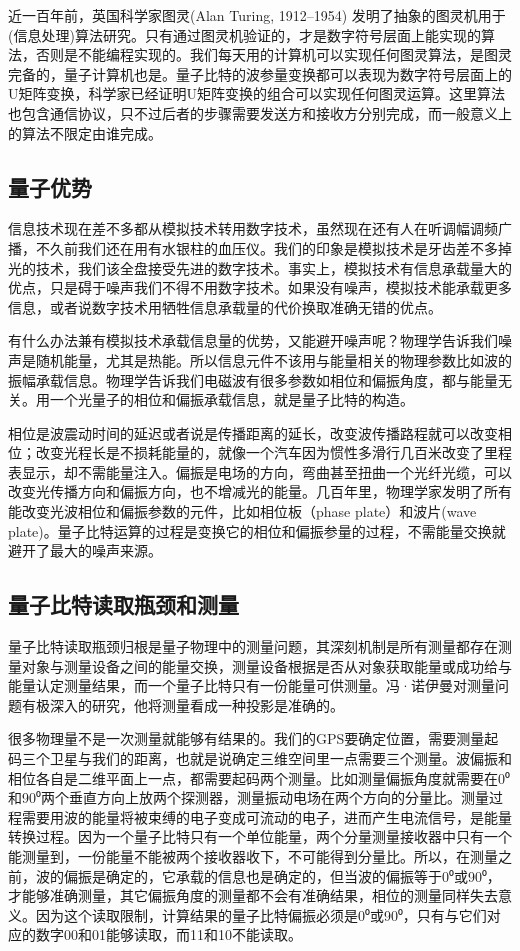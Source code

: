 \documentclass{ctexbook}
\begin{document}
近一百年前，英国科学家图灵(Alan Turing, 1912–1954) 发明了抽象的图灵机用于(信息处理)算法研究。只有通过图灵机验证的，才是数字符号层面上能实现的算法，否则是不能编程实现的。我们每天用的计算机可以实现任何图灵算法，是图灵完备的，量子计算机也是。量子比特的波参量变换都可以表现为数字符号层面上的U矩阵变换，科学家已经证明U矩阵变换的组合可以实现任何图灵运算。这里算法也包含通信协议，只不过后者的步骤需要发送方和接收方分别完成，而一般意义上的算法不限定由谁完成。

\subsection{量子优势}\label{sec:whyquantum}
信息技术现在差不多都从模拟技术转用数字技术，虽然现在还有人在听调幅调频广播，不久前我们还在用有水银柱的血压仪。我们的印象是模拟技术是牙齿差不多掉光的技术，我们该全盘接受先进的数字技术。事实上，模拟技术有信息承载量大的优点，只是碍于噪声我们不得不用数字技术。如果没有噪声，模拟技术能承载更多信息，或者说数字技术用牺牲信息承载量的代价换取准确无错的优点。

有什么办法兼有模拟技术承载信息量的优势，又能避开噪声呢？物理学告诉我们噪声是随机能量，尤其是热能。所以信息元件不该用与能量相关的物理参数比如波的振幅承载信息。物理学告诉我们电磁波有很多参数如相位和偏振角度，都与能量无关。用一个光量子的相位和偏振承载信息，就是量子比特的构造。

相位是波震动时间的延迟或者说是传播距离的延长，改变波传播路程就可以改变相位；改变光程长是不损耗能量的，就像一个汽车因为惯性多滑行几百米改变了里程表显示，却不需能量注入。偏振是电场的方向，弯曲甚至扭曲一个光纤光缆，可以改变光传播方向和偏振方向，也不增减光的能量。几百年里，物理学家发明了所有能改变光波相位和偏振参数的元件，比如相位板（phase plate）和波片(wave plate)。量子比特运算的过程是变换它的相位和偏振参量的过程，不需能量交换就避开了最大的噪声来源。

\subsection{量子比特读取瓶颈和测量}
量子比特读取瓶颈归根是量子物理中的测量问题，其深刻机制是所有测量都存在测量对象与测量设备之间的能量交换，测量设备根据是否从对象获取能量或成功给与能量认定测量结果，而一个量子比特只有一份能量可供测量。冯·诺伊曼对测量问题有极深入的研究，他将测量看成一种投影是准确的。

很多物理量不是一次测量就能够有结果的。我们的GPS要确定位置，需要测量起码三个卫星与我们的距离，也就是说确定三维空间里一点需要三个测量。波偏振和相位各自是二维平面上一点，都需要起码两个测量。比如测量偏振角度就需要在0⁰和90⁰两个垂直方向上放两个探测器，测量振动电场在两个方向的分量比。测量过程需要用波的能量将被束缚的电子变成可流动的电子，进而产生电流信号，是能量转换过程。因为一个量子比特只有一个单位能量，两个分量测量接收器中只有一个能测量到，一份能量不能被两个接收器收下，不可能得到分量比。所以，在测量之前，波的偏振是确定的，它承载的信息也是确定的，但当波的偏振等于0⁰或90⁰，才能够准确测量，其它偏振角度的测量都不会有准确结果，相位的测量同样失去意义。因为这个读取限制，计算结果的量子比特偏振必须是0⁰或90⁰，只有与它们对应的数字00和01能够读取，而11和10不能读取。
\end{document}
